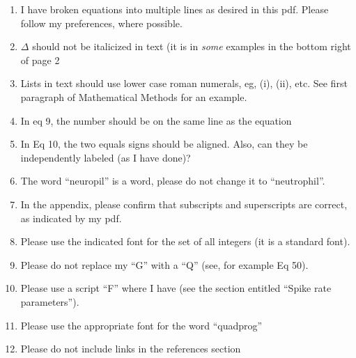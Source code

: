 \documentclass{article}
\begin{document}
\begin{enumerate}
\item I have broken equations into multiple lines as desired in this pdf.  Please follow my preferences, where possible.
\item $\Delta$ should not be italicized  in text (it is in \emph{some} examples in the bottom right of page 2
\item Lists in text should use lower case roman numerals, eg, (i), (ii), etc.  See first paragraph of Mathematical Methods for an example.
\item In eq 9, the number should be on the same line as the equation
\item In Eq 10, the two equals signs should be aligned. Also, can they be independently labeled (as I have done)?
\item The word ``neuropil'' is a word, please do not change it to ``neutrophil''.
\item In the appendix, please confirm that subscripts and superscripts are correct, as indicated by my pdf.
\item Please use the indicated font for the set of all integers (it is a standard font).
\item Please do not replace my ``G'' with a ``Q'' (see, for example Eq 50).
\item Please use a script ``F'' where I have (see the section entitled ``Spike rate parameters'').
\item Please use the appropriate font for the word ``quadprog''
\item Please do not include links in the references section
\end{enumerate}
\end{document}
